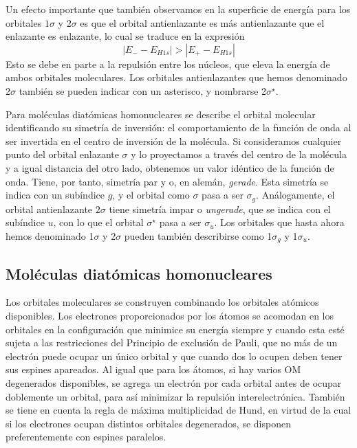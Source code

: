 Un efecto importante que también observamos en
la superficie de energía para los orbitales $1\sigma$
y $2\sigma$ es que el orbital antienlazante es más
antienlazante que el enlazante es enlazante, lo
cual se traduce en la expresión
\begin{equation}
    |E_{-}-E_{H1s}|>|E_+-E_{H1s}|
\end{equation}
Esto se debe en parte a la repulsión entre los 
núcleos, que eleva la energía de ambos orbitales 
moleculares. Los orbitales antienlazantes que hemos
denominado $2\sigma$ también se pueden indicar con 
un asterisco, y nombrarse 2$\sigma^\star$. 

Para moléculas diatómicas homonucleares se 
describe el orbital molecular identificando 
su simetría de inversión: el comportamiento de 
la función de onda al ser invertida en el centro 
de inversión de la molécula. Si consideramos cualquier
punto del orbital enlazante $\sigma$ y lo proyectamos
a través del centro de la molécula y a igual distancia
del otro lado, obtenemos un valor idéntico de la función
de onda. Tiene, por tanto, simetría par y o, en alemán, 
\textit{gerade}. Esta simetría se indica con un subíndice $g$,
y el orbital como $\sigma$ pasa a ser $\sigma_g$. 
Análogamente, el orbital antienlazante $2\sigma$ tiene
simetría impar o \textit{ungerade}, que  se indica con el 
subíndice $u$, con lo que el orbital $\sigma^\star$ pasa
a ser $\sigma_u$. Los orbitales que hasta ahora hemos
denominado 1$\sigma$ y 2$\sigma$ pueden también 
describirse como 1$\sigma_g$ y 1$\sigma_u$.

\subsection{Moléculas diatómicas homonucleares}
 Los orbitales moleculares se construyen combinando los orbitales
 atómicos disponibles. Los electrones proporcionados por los
 átomos se acomodan en los orbitales en la configuración que
 minimice su energía siempre y cuando esta esté sujeta a las restricciones del Principio de exclusión de Pauli, que no más
 de un electrón puede ocupar un único orbital y que cuando dos 
 lo ocupen deben tener sus espines apareados.
 Al igual que para los átomos, si hay varios OM degenerados
 disponibles, se agrega un electrón por cada orbital antes de
 ocupar doblemente un orbital, para así minimizar la repulsión 
 interelectrónica. También se tiene en cuenta la regla de máxima
 multiplicidad de Hund, en virtud de la cual si los electrones 
 ocupan distintos orbitales degenerados, se disponen 
 preferentemente con espines paralelos.

